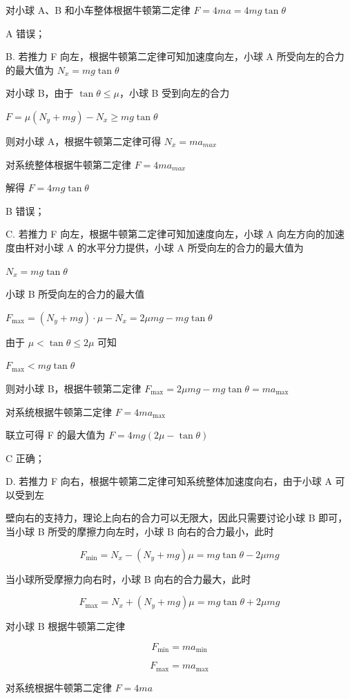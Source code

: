 \documentclass[\gkver]{gaokaozhenti}
\begin{document}
\begin{enumerate}
{对小球 A、B 和小车整体根据牛顿第二定律  $F = 4ma = 4mg \tan \theta$

A 错误；

B. 若推力 F 向左，根据牛顿第二定律可知加速度向左，小球 A 所受向左的合力的最大值为  $N_{x}=mg\tan\theta$

对小球 B，由于  $\tan\theta \leq \mu$，小球 B 受到向左的合力

 $F = \mu (N_y + mg) - N_x \geq mg \tan \theta$

则对小球 A，根据牛顿第二定律可得  $N_{x}=ma_{max}$

对系统整体根据牛顿第二定律  $F = 4ma_{max}$

解得  $F = 4mg \tan \theta$

B 错误；

C. 若推力 F 向左，根据牛顿第二定律可知加速度向左，小球 A 向左方向的加速度由杆对小球 A 的水平分力提供，小球 A 所受向左的合力的最大值为

 $N_{x}=mg\tan\theta$

小球 B 所受向左的合力的最大值

 $F_{\max} = (N_y + mg) \cdot \mu - N_x = 2\mu mg - mg \tan \theta$

由于  $\mu < \tan \theta \leq 2\mu$ 可知

 $F_{\max} < mg \tan \theta$

则对小球 B，根据牛顿第二定律  $F_{\max} = 2\mu mg - mg \tan \theta = ma_{\max}$

对系统根据牛顿第二定律  $F = 4ma_{\max}$

联立可得 F 的最大值为  $F = 4mg(2\mu - \tan\theta)$

C 正确；

D. 若推力 F 向右，根据牛顿第二定律可知系统整体加速度向右，由于小球 A 可以受到左

壁向右的支持力，理论上向右的合力可以无限大，因此只需要讨论小球 B 即可，当小球 B 所受的摩擦力向左时，小球 B 向右的合力最小，此时

$$ F _ {\min} = N _ {x} - (N _ {y} + m g) \mu = m g \tan \theta - 2 \mu m g $$

当小球所受摩擦力向右时，小球 B 向右的合力最大，此时

$$ F _ {\max} = N _ {x} + (N _ {y} + m g) \mu = m g \tan \theta + 2 \mu m g $$

对小球 B 根据牛顿第二定律

$$ F _ {\min} = m a _ {\min} $$

$$ F _ {\max} = m a _ {\max} $$

对系统根据牛顿第二定律 $F = 4ma$

}
\end{enumerate}
\end{document}

